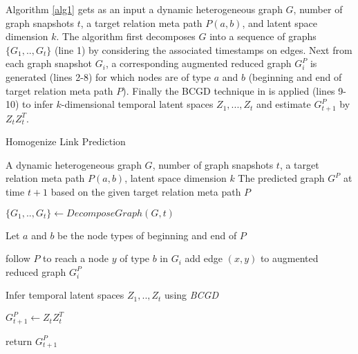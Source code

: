 


Algorithm \ref{alg1} gets as an input a dynamic heterogeneous graph $G$, number of graph snapshots $t$, a target relation meta path $P(a,b)$, and latent space dimension $k$. The algorithm first decomposes $G$ into a sequence of graphs $\{G_1, .., G_t\}$ (line 1) by considering the associated timestamps on edges. Next from each graph snapshot $G_i$, a corresponding augmented reduced graph $G^P_i$ is generated (lines 2-8) for which nodes are of type $a$ and $b$ (beginning and end of target relation meta path $P$). Finally the BCGD technique in \cite{Zhu2016} is applied (lines 9-10) to infer $k$-dimensional temporal latent spaces $Z_1, ...,Z_t$ and estimate $G^P_{t+1}$ by $Z_tZ_t^T$.


\begin{algorithm}[t]
\caption{Homogenize Link Prediction}\label{alg1}
\begin{algorithmic}[1]
\REQUIRE A dynamic heterogeneous graph $G$, number of graph snapshots $t$, a target relation meta path $P(a,b)$, latent space dimension $k$
\ENSURE The predicted graph $G^P$ at time $t+1$ based on the given target relation meta path $P$

\STATE $\{G_1, .., G_t\} \leftarrow DecomposeGraph(G, t)$

    \STATE Let $a$ and $b$ be the node types of beginning and end of $P$
    
        \STATE follow $P$ to reach a node $y$ of type $b$ in $G_i$ 
        \STATE add edge $(x,y)$ to augmented reduced graph $G_i^P$ 
\ENDFOR

\ENDFOR
\STATE Infer temporal latent spaces $Z_1, .., Z_t$ using \textit{BCGD}%

\STATE $G^P_{t+1} \leftarrow Z_tZ^T_t$ 

\STATE return $G^P_{t+1}$
\end{algorithmic}
\end{algorithm}



